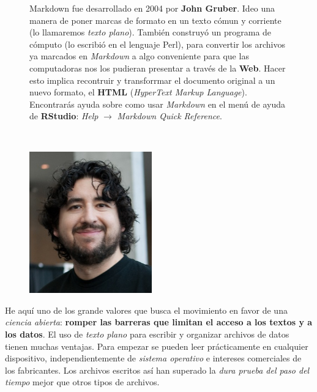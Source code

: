 \documentclass[
  letterpaper,
  DIV=11,
  numbers=noendperiod]{scrartcl}
\begin{document}
\begin{figure}

\begin{minipage}{0.58\linewidth}
Markdown fue desarrollado en 2004 por \textbf{John Gruber}. Ideo una
manera de poner marcas de formato en un texto cómun y corriente (lo
llamaremos \emph{texto plano}). También construyó un programa de cómputo
(lo escribió en el lenguaje Perl), para convertir los archivos ya
marcados en \emph{Markdown} a algo conveniente para que las computadoras
nos los pudieran presentar a través de la \textbf{Web}. Hacer esto
implica recontruir y transforrmar el documento original a un nuevo
formato, el \textbf{HTML} (\emph{HyperText Markup Language}).
Encontrarás ayuda sobre como usar \emph{Markdown} en el menú de ayuda de
\textbf{RStudio}: \emph{Help} \(\rightarrow\) \emph{Markdown Quick
Reference}.\end{minipage}%
%
\begin{minipage}{0.04\linewidth}
~\end{minipage}%
%
\begin{minipage}{0.39\linewidth}
\includegraphics[width=2.08333in,height=\textheight]{images/John_Gruber,_2009_(cropped) - By Randy Stewart, CC BY-SA 3.0, httpscommons.wikimedia.orgwindex.phpcurid=10682505.jpg}\end{minipage}%

\end{figure}%

He aquí uno de los grande valores que busca el movimiento en favor de
una \emph{ciencia abierta}: \textbf{romper las barreras que limitan el
acceso a los textos y a los datos}. El uso de \emph{texto plano} para
escribir y organizar archivos de datos tienen muchas ventajas. Para
empezar se pueden leer prácticamente en cualquier dispositivo,
independientemente de \emph{sistema operativo} e intereses comerciales
de los fabricantes. Los archivos escritos así han superado la \emph{dura
prueba del paso del tiempo} mejor que otros tipos de archivos.
\end{document}
